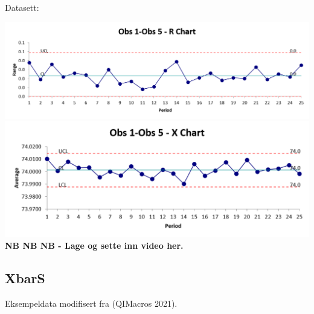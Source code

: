 \documentclass[
]{book}
\begin{document}
Datasett:

\includegraphics{rchart.png}
\includegraphics{xchart.png}
\textbf{NB NB NB - Lage og sette inn video her.}

\hypertarget{xbars}{%
\subsection{XbarS}\label{xbars}}

Eksempeldata modifisert fra (QIMacros 2021).

\providecommand{\docline}[3]{\noalign{\global\setlength{\arrayrulewidth}{#1}}\arrayrulecolor[HTML]{#2}\cline{#3}}

\setlength{\tabcolsep}{2pt}

\renewcommand*{\arraystretch}{1.5}
\end{document}
